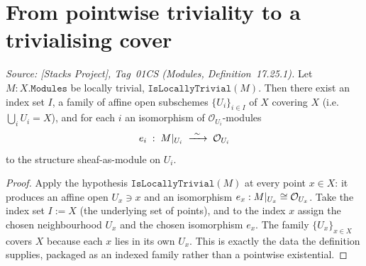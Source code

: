 \section{From pointwise triviality to a trivialising cover}
\label{sec:lbc_cover}

\begin{lemma}\leanok
  \label{lem:lbc_trivializing_cover}
  \textit{Source: [Stacks Project], Tag~01CS (Modules, Definition~17.25.1).}
  Let \(M : X.\mathtt{Modules}\) be locally trivial, \(\texttt{IsLocallyTrivial}(M)\).
  Then there exist an index set \(I\), a family of affine open subschemes
  \(\{U_i\}_{i \in I}\) of \(X\) covering \(X\) (i.e. \(\bigcup_i U_i = X\)), and
  for each \(i\) an isomorphism of \(\mathcal{O}_{U_i}\)-modules
  \[
    e_i \;:\; M|_{U_i} \;\xrightarrow{\ \sim\ }\; \struct{U_i}
  \]
  to the structure sheaf-as-module on \(U_i\).
\end{lemma}

\begin{proof}
  \leanok
  Apply the hypothesis \(\texttt{IsLocallyTrivial}(M)\) at every point \(x \in X\): it
  produces an affine open \(U_x \ni x\) and an isomorphism
  \(e_x : M|_{U_x} \cong \mathcal{O}_{U_x}\). Take the index set \(I := X\) (the
  underlying set of points), and to the index \(x\) assign the chosen
  neighbourhood \(U_x\) and the chosen isomorphism \(e_x\). The family
  \(\{U_x\}_{x \in X}\) covers \(X\) because each \(x\) lies in its own \(U_x\).
  This is exactly the data the definition supplies, packaged as an indexed
  family rather than a pointwise existential.
\end{proof}

